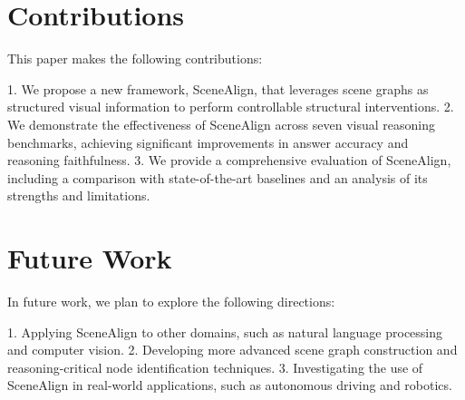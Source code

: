 \documentclass{article}
\begin{document}
\section{Contributions}

This paper makes the following contributions:

1. We propose a new framework, SceneAlign, that leverages scene graphs as structured visual information to perform controllable structural interventions.
2. We demonstrate the effectiveness of SceneAlign across seven visual reasoning benchmarks, achieving significant improvements in answer accuracy and reasoning faithfulness.
3. We provide a comprehensive evaluation of SceneAlign, including a comparison with state-of-the-art baselines and an analysis of its strengths and limitations.

\section{Future Work}

In future work, we plan to explore the following directions:

1. Applying SceneAlign to other domains, such as natural language processing and computer vision.
2. Developing more advanced scene graph construction and reasoning-critical node identification techniques.
3. Investigating the use of SceneAlign in real-world applications, such as autonomous driving and robotics.
\end{document}

